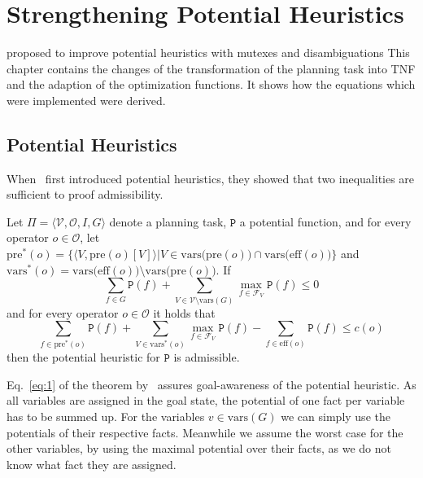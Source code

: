 
\chapter{Strengthening Potential Heuristics}\label{ch:strengthening-potential-heuristics}

\citeauthor{fivser2020strengthening} proposed to improve potential heuristics with mutexes and disambiguations
This chapter contains the changes of the transformation of the planning task into TNF and the adaption of the optimization functions.
It shows how the equations which were implemented were derived.

\section{Potential Heuristics}\label{sec:potential-heuristics}

When~\citeauthor{pommerening2015non} first introduced potential heuristics, they showed that two inequalities are sufficient to proof admissibility.

\begin{theorem}
    \label{theorem:theorem 5} %
    Let $\Pi = \langle \mathcal{V}, \mathcal{O}, I, G \rangle$ denote a planning task, $\mathtt{P}$ a
    potential function, and for every operator $o\in\mathcal{O}$, let
    $\mathrm{pre}^*(o)=\{\langle V, \mathrm{pre}(o)[V]\rangle |V\in \mathrm{vars(pre}(o))\cap\mathrm{vars(eff}(o))\}$ and
    $\mathrm{vars}^*(o)=\mathrm{vars(eff}(o))\setminus\mathrm{vars(pre}(o))$. If
    \[\sum_{f\in G}\mathtt{P}(f)+\sum_{V\in\mathcal{V}\setminus\mathrm{vars}(G)}\max_{f\in\mathcal{F}_V}\mathtt{P}(f)\leq0\label{eq:1}\tag{1}\]
    and for every operator $o\in\mathcal{O}$ it holds that
    \[\sum_{f\in\mathrm{pre}^*(o)}\mathtt{P}(f)+\sum_{V\in\mathrm{vars}^*(o)}\max_{f\in\mathcal{F}_V}\mathtt{P}(f)-\sum_{f\in\mathrm{eff}(o)}\mathtt{P}(f)\leq c(o)\label{eq:2}\tag{2}\]
    then the potential heuristic for $\mathtt{P}$ is admissible.
\end{theorem}


Eq.~\eqref{eq:1} of the theorem by~\citeauthor{fivser2020strengthening} assures goal-awareness of the potential heuristic.
As all variables are assigned in the goal state, the potential of one fact per variable has to be summed up.
For the variables $v\in\text{vars}(G)$ we can simply use the potentials of their respective facts.
Meanwhile we assume the worst case for the other variables, by using the maximal potential over their facts, as we do not know what fact they are assigned.

